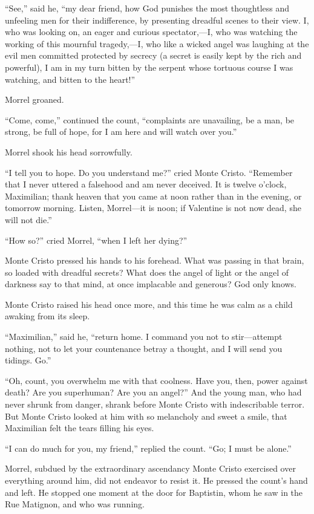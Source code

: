 “See,” said he, “my dear friend, how God punishes the most thoughtless
and unfeeling men for their indifference, by presenting dreadful scenes
to their view. I, who was looking on, an eager and curious
spectator,—I, who was watching the working of this mournful tragedy,—I,
who like a wicked angel was laughing at the evil men committed
protected by secrecy (a secret is easily kept by the rich and
powerful), I am in my turn bitten by the serpent whose tortuous course
I was watching, and bitten to the heart!”

Morrel groaned.

“Come, come,” continued the count, “complaints are unavailing, be a
man, be strong, be full of hope, for I am here and will watch over
you.”

Morrel shook his head sorrowfully.

“I tell you to hope. Do you understand me?” cried Monte Cristo.
“Remember that I never uttered a falsehood and am never deceived. It is
twelve o’clock, Maximilian; thank heaven that you came at noon rather
than in the evening, or tomorrow morning. Listen, Morrel—it is noon; if
Valentine is not now dead, she will not die.”

“How so?” cried Morrel, “when I left her dying?”

Monte Cristo pressed his hands to his forehead. What was passing in
that brain, so loaded with dreadful secrets? What does the angel of
light or the angel of darkness say to that mind, at once implacable and
generous? God only knows.

Monte Cristo raised his head once more, and this time he was calm as a
child awaking from its sleep.

“Maximilian,” said he, “return home. I command you not to stir—attempt
nothing, not to let your countenance betray a thought, and I will send
you tidings. Go.”

“Oh, count, you overwhelm me with that coolness. Have you, then, power
against death? Are you superhuman? Are you an angel?” And the young
man, who had never shrunk from danger, shrank before Monte Cristo with
indescribable terror. But Monte Cristo looked at him with so melancholy
and sweet a smile, that Maximilian felt the tears filling his eyes.

“I can do much for you, my friend,” replied the count. “Go; I must be
alone.”

Morrel, subdued by the extraordinary ascendancy Monte Cristo exercised
over everything around him, did not endeavor to resist it. He pressed
the count’s hand and left. He stopped one moment at the door for
Baptistin, whom he saw in the Rue Matignon, and who was running.

